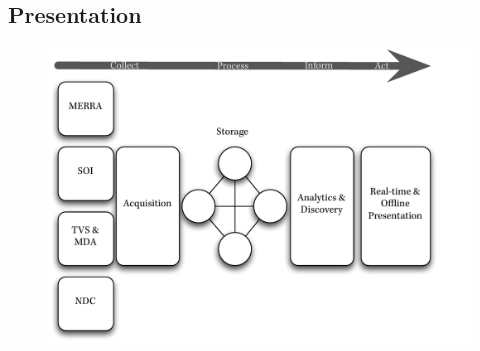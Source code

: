 \subsection*{Presentation}

\begin{figure}[htbp]
    \centering
    \includegraphics[scale=.9]{dataflow}
\end{figure}

\renewcommand\bibname{{References}}



